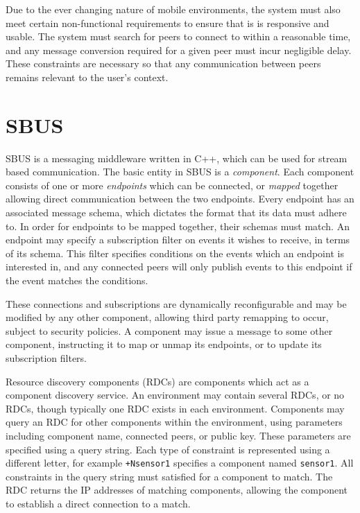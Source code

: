 \documentclass[12pt,twoside,notitlepage]{report}
\begin{document}
Due to the ever changing nature of mobile environments, the system must also meet certain non-functional requirements to ensure that is is responsive and usable. 
The system must search for peers to connect to within a reasonable time, and any message conversion required for a given peer must incur negligible delay.
These constraints are necessary so that any communication between peers remains relevant to the user's context.

\section{SBUS}

SBUS \cite{ingram2009reconfigurable} is a messaging middleware written in C++, which can be used for stream based communication. 
The basic entity in SBUS is a {\sl component}. 
Each component consists of one or more {\sl endpoints} which can be connected, or {\sl mapped} together allowing direct communication between the two endpoints. 
Every endpoint has an associated message schema, which dictates the format that its data must adhere to. 
In order for endpoints to be mapped together, their schemas must match. 
An endpoint may specify a subscription filter on events it wishes to receive, in terms of its schema. 
This filter specifies conditions on the events which an endpoint is interested in, and any connected peers will only publish events to this endpoint if the event matches the conditions.

These connections and subscriptions are dynamically reconfigurable and may be modified by any other component, allowing third party remapping to occur, subject to security policies. 
A component may issue a message to some other component, instructing it to map or unmap its endpoints, or to update its subscription filters.

Resource discovery components (RDCs) are components which act as a component discovery service. 
An environment may contain several RDCs, or no RDCs, though typically one RDC exists in each environment.
Components may query an RDC for other components within the environment, using parameters including component name, connected peers, or public key. 
These parameters are specified using a query string. 
Each type of constraint is represented using a different letter, for example {\tt +Nsensor1} specifies a component named {\tt sensor1}. 
All constraints in the query string must satisfied for a component to match. 
The RDC returns the IP addresses of matching components, allowing the component to establish a direct connection to a match.
\end{document}
